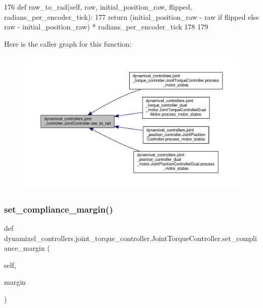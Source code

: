 \begin{DoxyCode}
176     \textcolor{keyword}{def }raw\_to\_rad(self, raw, initial\_position\_raw, flipped, radians\_per\_encoder\_tick):
177         \textcolor{keywordflow}{return} (initial\_position\_raw - raw \textcolor{keywordflow}{if} flipped \textcolor{keywordflow}{else} raw - initial\_position\_raw) * 
      radians\_per\_encoder\_tick
178 
179 \end{DoxyCode}
Here is the caller graph for this function\+:
\nopagebreak
\begin{figure}[H]
\begin{center}
\leavevmode
\includegraphics[width=350pt]{d3/dcd/classdynamixel__controllers_1_1joint__controller_1_1_joint_controller_a58a58e669c2918d00cc358f2b58d061c_icgraph}
\end{center}
\end{figure}
\mbox{\label{classdynamixel__controllers_1_1joint__torque__controller_1_1_joint_torque_controller_a69b63d49faf52179c247f0a101946ae6}} 
\subsubsection{\texorpdfstring{set\+\_\+compliance\+\_\+margin()}{set\_compliance\_margin()}}
{\footnotesize\ttfamily def dynamixel\+\_\+controllers.\+joint\+\_\+torque\+\_\+controller.\+Joint\+Torque\+Controller.\+set\+\_\+compliance\+\_\+margin (\begin{DoxyParamCaption}\item[{}]{self,  }\item[{}]{margin }\end{DoxyParamCaption})}



